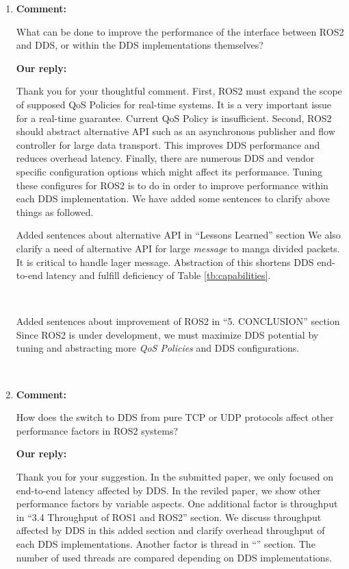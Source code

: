\documentclass{article}
\begin{document}
\begin{enumerate}
\item \begin{flushleft}
  \textbf{Comment:}
\end{flushleft}
  What can be done to improve the performance of the interface between ROS2 and DDS, or within the DDS implementations themselves?

  \begin{flushleft}
    \textbf{Our reply:}
  \end{flushleft}
  Thank you for your thoughtful comment.
  First, ROS2 must expand the scope of supposed QoS Policies for real-time systems.
  It is a very important issue for a real-time guarantee.
  Current QoS Policy is insufficient.
  Second, ROS2 should abstract alternative API such as an asynchronous publisher and flow controller for large data transport.
  This improves DDS performance and reduces overhead latency.
  Finally, there are numerous DDS and vendor specific configuration options which might affect its performance.
  Tuning these configures for ROS2 is to do in order to improve performance within each DDS implementation.
  We have added some sentences to clarify above things as followed.
  \begin{itembox}[|]{Added sentences about alternative API in ``Lessons Learned'' section}
    We also clarify a need of alternative API for large \emph{message} to manga divided packets.
    It is critical to handle lager message.
    Abstraction of this shortens DDS end-to-end latency and fulfill deficiency of Table \ref{tb:capabilities}.
  \end{itembox}\\
  \begin{itembox}[|]{Added sentences about improvement of ROS2 in ``5. CONCLUSION'' section}
    Since ROS2 is under development, we must maximize DDS potential by tuning and abstracting more \emph{QoS Policies} and DDS configurations.
  \end{itembox}\\

\item \begin{flushleft}
  \textbf{Comment:}
\end{flushleft}
  How does the switch to DDS from pure TCP or UDP protocols affect other performance factors in ROS2 systems? 

  \begin{flushleft}
    \textbf{Our reply:}
  \end{flushleft}
  Thank you for your suggestion.
  In the submitted paper, we only focused on end-to-end latency affected by DDS.
  In the reviled paper, we show other performance factors by variable aspects.
  One additional factor is throughput in ``3.4 Throughput of ROS1 and ROS2'' section.
  We discuss throughput affected by DDS in this added section and clarify overhead throughput of each DDS implementations.
  Another factor is thread in ``'' section.
  The number of used threads are compared depending on DDS implementations.

\end{enumerate}
\end{document}
